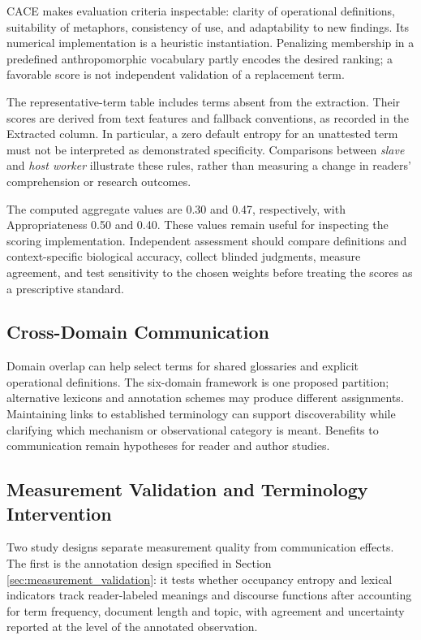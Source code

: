 \documentclass[
]{article}
\numberwithin{equation}{section}
\begin{document}
CACE makes evaluation criteria inspectable: clarity of operational
definitions, suitability of metaphors, consistency of use, and
adaptability to new findings. Its numerical implementation is a
heuristic instantiation. Penalizing membership in a predefined
anthropomorphic vocabulary partly encodes the desired ranking; a
favorable score is not independent validation of a replacement term.

The representative-term table includes terms absent from the extraction.
Their scores are derived from text features and fallback conventions, as
recorded in the Extracted column. In particular, a zero default entropy
for an unattested term must not be interpreted as demonstrated
specificity. Comparisons between \emph{slave} and \emph{host worker}
illustrate these rules, rather than measuring a change in readers'
comprehension or research outcomes.

The computed aggregate values are 0.30 and 0.47, respectively, with
Appropriateness 0.50 and 0.40. These values remain useful for inspecting
the scoring implementation. Independent assessment should compare
definitions and context-specific biological accuracy, collect blinded
judgments, measure agreement, and test sensitivity to the chosen weights
before treating the scores as a prescriptive standard.

\subsection{Cross-Domain
Communication}\label{cross-domain-communication}

Domain overlap can help select terms for shared glossaries and explicit
operational definitions. The six-domain framework is one proposed
partition; alternative lexicons and annotation schemes may produce
different assignments. Maintaining links to established terminology can
support discoverability while clarifying which mechanism or
observational category is meant. Benefits to communication remain
hypotheses for reader and author studies.

\subsection{Measurement Validation and Terminology
Intervention}\label{measurement-validation-and-terminology-intervention}

Two study designs separate measurement quality from communication
effects. The first is the annotation design specified in Section
\ref{sec:measurement_validation}: it tests whether occupancy entropy and
lexical indicators track reader-labeled meanings and discourse functions
after accounting for term frequency, document length and topic, with
agreement and uncertainty reported at the level of the annotated
observation.
\end{document}
